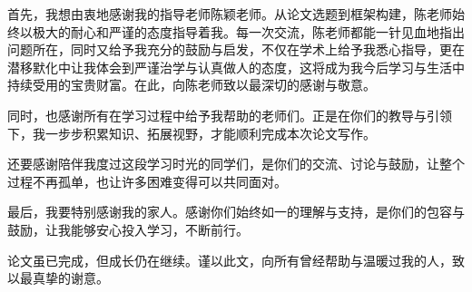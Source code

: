 \documentclass[12pt,a4paper]{ctexrep}   %
\begin{document}
首先，我想由衷地感谢我的指导老师陈颖老师。从论文选题到框架构建，陈老师始终以极大的耐心和严谨的态度指导着我。每一次交流，陈老师都能一针见血地指出问题所在，同时又给予我充分的鼓励与启发，不仅在学术上给予我悉心指导，更在潜移默化中让我体会到严谨治学与认真做人的态度，这将成为我今后学习与生活中持续受用的宝贵财富。在此，向陈老师致以最深切的感谢与敬意。

同时，也感谢所有在学习过程中给予我帮助的老师们。正是在你们的教导与引领下，我一步步积累知识、拓展视野，才能顺利完成本次论文写作。

还要感谢陪伴我度过这段学习时光的同学们，是你们的交流、讨论与鼓励，让整个过程不再孤单，也让许多困难变得可以共同面对。

最后，我要特别感谢我的家人。感谢你们始终如一的理解与支持，是你们的包容与鼓励，让我能够安心投入学习，不断前行。

论文虽已完成，但成长仍在继续。谨以此文，向所有曾经帮助与温暖过我的人，致以最真挚的谢意。




\renewcommand*{\bibfont}{\zihao{5}}

\printbibliography[title={\centering \zihao{3}\bfseries 参考文献}]
\end{document}
